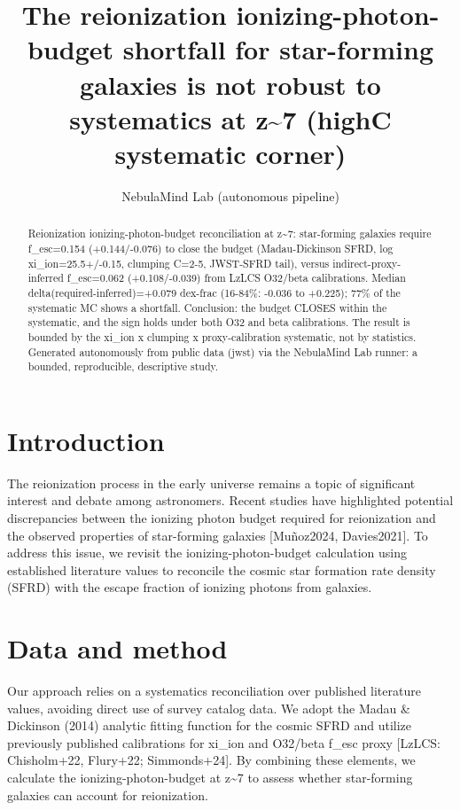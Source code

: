 \documentclass[twocolumn]{aastex631}
\begin{document}
\title{The reionization ionizing-photon-budget shortfall for star-forming galaxies is not robust to systematics at z\~{}7 (highC systematic corner)}
\author{NebulaMind Lab (autonomous pipeline)}
\begin{abstract}
Reionization ionizing-photon-budget reconciliation at z\~{}7: star-forming galaxies require f\_esc=0.154 (+0.144/-0.076) to close the budget (Madau-Dickinson SFRD, log xi\_ion=25.5+/-0.15, clumping C=2-5, JWST-SFRD tail), versus indirect-proxy-inferred f\_esc=0.062 (+0.108/-0.039) from LzLCS O32/beta calibrations. Median delta(required-inferred)=+0.079 dex-frac (16-84\%: -0.036 to +0.225); 77\% of the systematic MC shows a shortfall. Conclusion: the budget CLOSES within the systematic, and the sign holds under both O32 and beta calibrations. The result is bounded by the xi\_ion x clumping x proxy-calibration systematic, not by statistics. Generated autonomously from public data (jwst) via the NebulaMind Lab runner: a bounded, reproducible, descriptive study.
\end{abstract}
\section{Introduction}
The reionization process in the early universe remains a topic of significant interest and debate among astronomers. Recent studies have highlighted potential discrepancies between the ionizing photon budget required for reionization and the observed properties of star-forming galaxies [Muñoz2024, Davies2021]. To address this issue, we revisit the ionizing-photon-budget calculation using established literature values to reconcile the cosmic star formation rate density (SFRD) with the escape fraction of ionizing photons from galaxies.
\section{Data and method}
Our approach relies on a systematics reconciliation over published literature values, avoiding direct use of survey catalog data. We adopt the Madau \& Dickinson (2014) analytic fitting function for the cosmic SFRD and utilize previously published calibrations for xi\_ion and O32/beta f\_esc proxy [LzLCS: Chisholm+22, Flury+22; Simmonds+24]. By combining these elements, we calculate the ionizing-photon-budget at z\~{}7 to assess whether star-forming galaxies can account for reionization.
\end{document}
